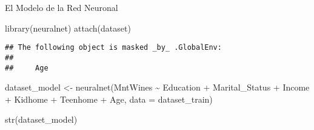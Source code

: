 \documentclass[Iberoamerican Journal of Industrial
Engineering,article,submit,moreauthors,pdftex]{Definitions/mdpi}
\newenvironment{Shaded}{\begin{snugshade}}{\end{snugshade}}
\newcommand{\AttributeTok}[1]{\textcolor[rgb]{0.77,0.63,0.00}{#1}}
\newcommand{\FunctionTok}[1]{\textcolor[rgb]{0.00,0.00,0.00}{#1}}
\newcommand{\NormalTok}[1]{#1}
\newcommand{\OtherTok}[1]{\textcolor[rgb]{0.56,0.35,0.01}{#1}}
\newcommand{\SpecialCharTok}[1]{\textcolor[rgb]{0.00,0.00,0.00}{#1}}
\begin{document}
El Modelo de la Red Neuronal

\begin{Shaded}
\begin{Highlighting}[]
\FunctionTok{library}\NormalTok{(neuralnet)}
\FunctionTok{attach}\NormalTok{(dataset)}
\end{Highlighting}
\end{Shaded}

\begin{verbatim}
## The following object is masked _by_ .GlobalEnv:
## 
##     Age
\end{verbatim}

\begin{Shaded}
\begin{Highlighting}[]
\NormalTok{dataset\_model }\OtherTok{\textless{}{-}} \FunctionTok{neuralnet}\NormalTok{(MntWines }\SpecialCharTok{\textasciitilde{}}\NormalTok{ Education }\SpecialCharTok{+}\NormalTok{ Marital\_Status }\SpecialCharTok{+}\NormalTok{ Income }\SpecialCharTok{+}\NormalTok{ Kidhome }\SpecialCharTok{+}\NormalTok{ Teenhome }\SpecialCharTok{+}\NormalTok{ Age, }\AttributeTok{data =}\NormalTok{ dataset\_train)}

\FunctionTok{str}\NormalTok{(dataset\_model)}
\end{Highlighting}
\end{Shaded}
\end{document}
